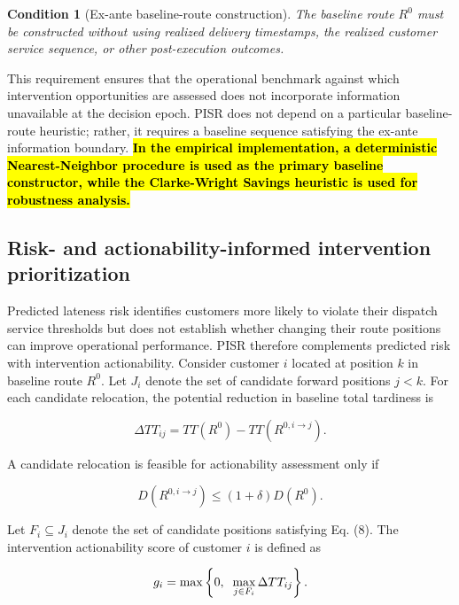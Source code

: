\documentclass[11pt,a4paper]{article}
\newtheorem{condition}{Condition}
\begin{document}
\begin{condition}[Ex-ante baseline-route construction]
The baseline route \(R^{0}\) must be constructed without using realized delivery timestamps, the realized customer service sequence, or other post-execution outcomes.
\end{condition}

This requirement ensures that the operational benchmark against which
intervention opportunities are assessed does not incorporate information
unavailable at the decision epoch. PISR does not depend on a particular
baseline-route heuristic; rather, it requires a baseline sequence
satisfying the ex-ante information boundary. \textbf{\hl{In the
empirical implementation, a deterministic Nearest-Neighbor procedure is
used as the primary baseline constructor, while the Clarke-Wright
Savings heuristic is used for robustness analysis.}}

\subsection{Risk- and actionability-informed intervention prioritization}\label{sec:prioritization}

Predicted lateness risk identifies customers more likely to violate
their dispatch service thresholds but does not establish whether changing
their route positions can improve operational performance. PISR
therefore complements predicted risk with intervention actionability.
Consider customer \(i\) located at position \(k\) in baseline route
\(R^{0}\). Let \(J_{i}\) denote the set of candidate forward positions
\(j < k\). For each candidate relocation, the potential reduction in
baseline total tardiness is

\begin{equation}
\Delta TT_{ij} = TT\left( R^{0} \right) - TT\left( R^{0,i \rightarrow j} \right).
\label{eq:7}
\end{equation}

A candidate relocation is feasible for actionability assessment only if

\begin{equation}
D\left( R^{0,i \rightarrow j} \right) \leq (1 + \delta)D\left( R^{0} \right).
\label{eq:8}
\end{equation}

Let \(F_{i} \subseteq J_{i}\) denote the set of candidate positions
satisfying Eq. (8). The intervention actionability score of customer
\(i\) is defined as

\begin{equation}
g_{i} = \max\left\{ 0,\text{\:\,}\max_{j \in F_{i}}\Delta TT_{ij} \right\}.
\label{eq:9}
\end{equation}
\end{document}
